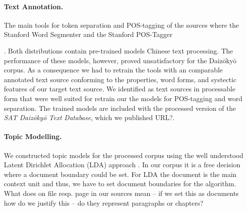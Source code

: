 \documentclass[a4paper,10pt]{article}
\newcommand{\TODO}[1]{\begingroup\color{red}#1\endgroup}
\begin{document}
\paragraph{Text Annotation.} 
  The main tools for token separation and POS-tagging of the sources where
  the Stanford Word Segmenter and the Stanford POS-Tagger {\cite{manning:2014}. Both distributions contain pre-trained models Chinese
  text processing. The performance of these models, however, proved
  unsatisfactory for the Daiz{\=o}ky{\=o} corpus. As a consequence we had
  to retrain the tools with an comparable annotated text source conforming
  to the properties, word forms, and \TODO{systectic} features of our
  target text source.  We identified \cite{Lee:12,Wong:16} as text sources
  in processable form that were well suited for retrain our the models for
  POS-tagging and word separation. The trained models are included with the
  processed version of the \textit{SAT Daiz{\=o}ky{\=o} Text Database},
  which we published \TODO{URL?}.

\paragraph{Topic Modelling.}
  We constructed topic models for the processed corpus using the well
  understood Latent Dirichlet Allocation (LDA) approach \cite{blei:2012,griffiths:2004}. In our corpus it is a free decision where a document boundary could be set.  For LDA the document is the main context unit and thus, we have to set document boundaries for the algorithm. \TODO{What does on file resp. page in our sources mean -- if we set this as documents how do we justify this -- do they represent paragraphs or chapters?}

}
\end{document}

